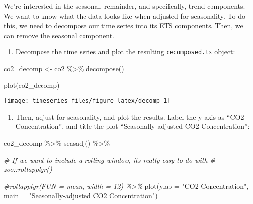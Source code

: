 \documentclass[
]{book}
\newenvironment{Shaded}{\begin{snugshade}}{\end{snugshade}}
\newcommand{\AttributeTok}[1]{\textcolor[rgb]{0.77,0.63,0.00}{#1}}
\newcommand{\CommentTok}[1]{\textcolor[rgb]{0.56,0.35,0.01}{\textit{#1}}}
\newcommand{\FunctionTok}[1]{\textcolor[rgb]{0.00,0.00,0.00}{#1}}
\newcommand{\NormalTok}[1]{#1}
\newcommand{\OtherTok}[1]{\textcolor[rgb]{0.56,0.35,0.01}{#1}}
\newcommand{\SpecialCharTok}[1]{\textcolor[rgb]{0.00,0.00,0.00}{#1}}
\newcommand{\StringTok}[1]{\textcolor[rgb]{0.31,0.60,0.02}{#1}}
\providecommand{\tightlist}{%
  \setlength{\itemsep}{0pt}\setlength{\parskip}{0pt}}
\begin{document}
We're interested in the seasonal, remainder, and specifically, trend components. We want to know what the data looks like when adjusted for seasonality. To do this, we need to decompose our time series into its ETS components. Then, we can remove the seasonal component.

\begin{enumerate}
\def\labelenumi{\arabic{enumi}.}
\setcounter{enumi}{2}
\tightlist
\item
  Decompose the time series and plot the resulting \texttt{decomposed.ts} object:
\end{enumerate}

\begin{Shaded}
\begin{Highlighting}[]
\NormalTok{co2\_decomp }\OtherTok{\textless{}{-}}\NormalTok{ co2 }\SpecialCharTok{\%\textgreater{}\%}
  \FunctionTok{decompose}\NormalTok{()}

\FunctionTok{plot}\NormalTok{(co2\_decomp)}
\end{Highlighting}
\end{Shaded}

\begin{center}\texttt{[image: timeseries\_files/figure-latex/decomp-1]} \end{center}

\begin{enumerate}
\def\labelenumi{\arabic{enumi}.}
\setcounter{enumi}{3}
\tightlist
\item
  Then, adjust for seasonality, and plot the results. Label the y-axis as ``CO2 Concentration'', and title the plot ``Seasonally-adjusted CO2 Concentration'':
\end{enumerate}

\begin{Shaded}
\begin{Highlighting}[]
\NormalTok{co2\_decomp }\SpecialCharTok{\%\textgreater{}\%} 
  \FunctionTok{seasadj}\NormalTok{() }\SpecialCharTok{\%\textgreater{}\%} 
  
  \CommentTok{\# If we want to include a rolling window, it\textquotesingle{}s really easy to do with}
  \CommentTok{\# zoo::rollapplyr()}
  
  \CommentTok{\#rollapplyr(FUN = mean, width = 12) \%\textgreater{}\%}
  \FunctionTok{plot}\NormalTok{(}\AttributeTok{ylab =} \StringTok{"CO2 Concentration"}\NormalTok{, }\AttributeTok{main =} \StringTok{"Seasonally{-}adjusted CO2 Concentration"}\NormalTok{)}
\end{Highlighting}
\end{Shaded}
\end{document}
